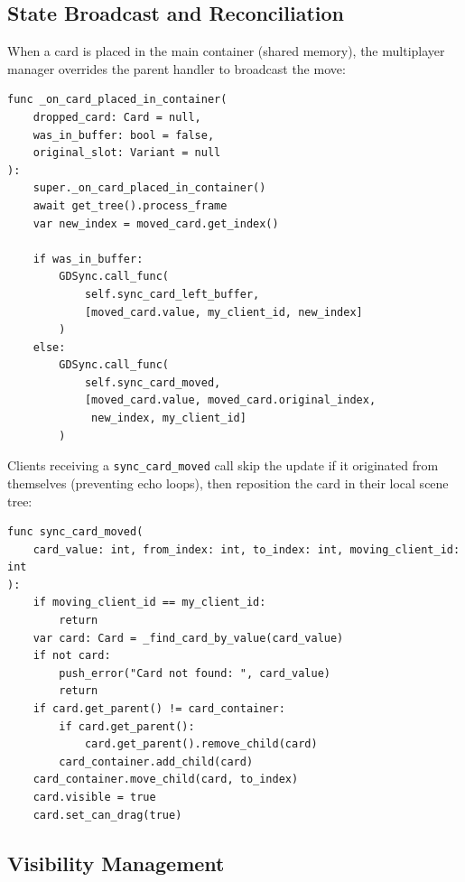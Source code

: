 \subsection{State Broadcast and Reconciliation}
\label{subsec:state-broadcast}

When a card is placed in the main container (shared memory), the multiplayer manager overrides the parent handler to broadcast the move:

\begin{lstlisting}[caption={Card movement broadcast (multiplayer\_card\_manager.gd)}]
func _on_card_placed_in_container(
    dropped_card: Card = null,
    was_in_buffer: bool = false,
    original_slot: Variant = null
):
    super._on_card_placed_in_container()
    await get_tree().process_frame
    var new_index = moved_card.get_index()

    if was_in_buffer:
        GDSync.call_func(
            self.sync_card_left_buffer,
            [moved_card.value, my_client_id, new_index]
        )
    else:
        GDSync.call_func(
            self.sync_card_moved,
            [moved_card.value, moved_card.original_index,
             new_index, my_client_id]
        )
\end{lstlisting}

Clients receiving a \texttt{sync\_card\_moved} call skip the update if it originated from themselves (preventing echo loops), then reposition the card in their local scene tree:

\begin{lstlisting}[caption={Remote card movement handler (multiplayer\_card\_manager.gd)}]
func sync_card_moved(
    card_value: int, from_index: int, to_index: int, moving_client_id: int
):
    if moving_client_id == my_client_id:
        return
    var card: Card = _find_card_by_value(card_value)
    if not card:
        push_error("Card not found: ", card_value)
        return
    if card.get_parent() != card_container:
        if card.get_parent():
            card.get_parent().remove_child(card)
        card_container.add_child(card)
    card_container.move_child(card, to_index)
    card.visible = true
    card.set_can_drag(true)
\end{lstlisting}

\subsection{Visibility Management}
\label{subsec:visibility-management}

